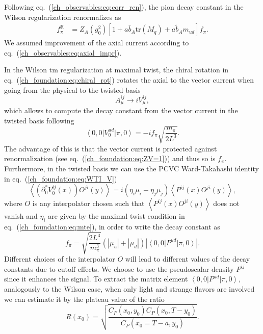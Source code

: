 Following eq.~(\ref{ch_observables:eq:corr_ren}), the pion decay constant in the Wilson regularization renormalizes as
\begin{align}
f_{\pi}^{\textrm{R}}&=Z_A(g_0^2)\left[1+a\bar{b}_A{\textrm{tr}}\left(M_q\right)+a\tilde{b}_Am_{ud}\right]f_{\pi}.
\end{align}
We assumed improvement of the axial current according to eq.~(\ref{ch_observables:eq:axial_impr}).

In the Wilson tm regularization at maximal twist, the chiral rotation in eq.~(\ref{ch_foundation:eq:chiral_rot}) rotates the axial to the vector current when going from the physical to the twisted basis
\begin{equation}
A_{\mu}^{ij}\rightarrow iV_{\mu}^{ij},
\end{equation}
which allows to compute the decay constant from the vector current in the twisted basis following
\begin{equation}
\label{ch_observables:eq:vector_matrix_element}
\left<0,0\right|V_0^{ud}\left|\pi,0\right>=-if_{\pi}\sqrt{\frac{m_{\pi}}{2L^3}}.
\end{equation}
The advantage of this is that the vector current is protected against renormalization (see eq.~(\ref{ch_foundation:eq:ZV=1})) and thus so is $f_{\pi}$. Furthermore, in the twisted basis we can use the PCVC Ward-Takahashi identity in eq.~(\ref{ch_foundation:eq:WTI_V})
\begin{equation}
\left<\left(\partial_0^*V_0^{ij}(x)\right)O^{ji}(y)\right>=i\left(\eta_i\mu_i-\eta_{j}\mu_{j}\right)\left<P^{ij}(x)O^{ji}(y)\right>,
\end{equation}
where $O$ is any interpolator chosen such that $\left<P^{ij}(x)O^{ji}(y)\right>$ does not vanish and $\eta_i$ are given by the maximal twist condition in eq.~(\ref{ch_foundation:eq:mte}), in order to write the decay constant as
\begin{equation}
\label{ch_observables:eq:f_OBC}
f_{\pi}=\sqrt{\frac{2L^3}{m_{\pi}^3}}\left(|\mu_u|+|\mu_{d}|\right)\left|\left<0,0\right|P^{ud}\left|\pi,0\right>\right|.
\end{equation}
Different choices of the interpolator $O$ will lead to different values of the decay constants due to cutoff effects. We choose to use the pseudoscalar density $P^{ij}$ since it enhances the signal. To extract the matrix element $\left<0,0\right|P^{ud}\left|\pi,0\right>$, analogously to the Wilson case, when only light and strange flavors are involved we can estimate it by the plateau value of the ratio
\begin{equation}
\label{ch_observables:eq:R_tm}
R(x_0)=\sqrt{\frac{C_P(x_0,y_0)C_P(x_0,T-y_0)}{C_P(x_0=T-a,y_0)}}.
\end{equation}

